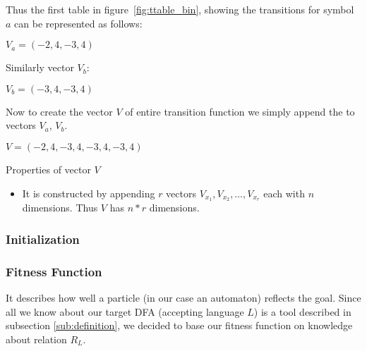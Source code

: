 \documentclass[runningheads,a4paper]{llncs}
\begin{document}
Thus the first table in figure~\ref{fig:ttable_bin}, showing the transitions for symbol $a$ can be represented as follows:

\begin{center}
	$V_a = (-2, 4, -3, 4)$
\end{center}

Similarly vector $V_b$:

\begin{center}
	$V_b = (-3, 4, -3, 4)$
\end{center}

Now to create the vector $V$ of entire transition function we simply append the to vectors $V_a$, $V_b$.

\begin{center}
	$V = (-2,4,-3,4,-3,4,-3,4)$
\end{center}

Properties of vector $V$
\begin{itemize}
	\item It is constructed by appending $r$ vectors $V_{x_1}, V_{x_2}, \ldots, V_{x_{r}}$ each with $n$ dimensions. Thus $V$ has $n * r$ dimensions.
	
\end{itemize}

\subsubsection{Initialization}

\subsubsection{Fitness Function}
It describes how well a particle (in our case an automaton) reflects the goal. Since all we know about our target DFA (accepting language $L$) is a tool described in subsection \ref{sub:definition}, we decided to base our fitness function on knowledge about relation $R_{L}$. 
\end{document}

